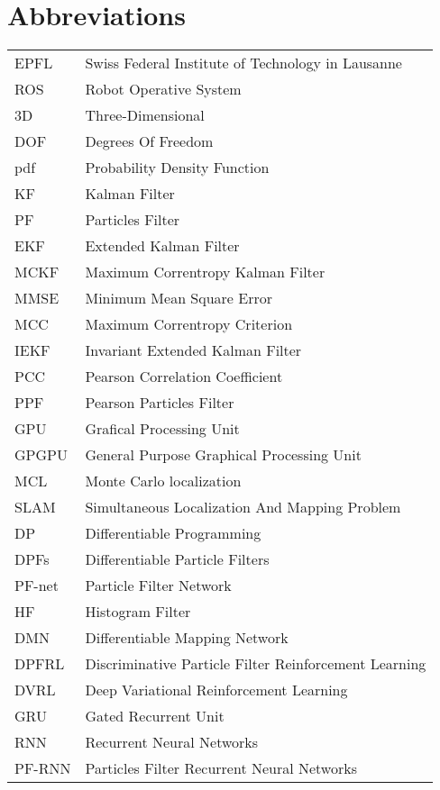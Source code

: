 \section{Abbreviations}
\begin{flushleft}
\begin{tabular}{l l}
EPFL & Swiss Federal Institute of Technology in Lausanne\\
ROS & Robot Operative System\\
3D & Three-Dimensional\\
DOF & Degrees Of Freedom\\
pdf & Probability Density Function\\
KF & Kalman Filter\\
PF & Particles Filter\\
EKF & Extended Kalman Filter\\
MCKF & Maximum Correntropy Kalman Filter\\
MMSE & Minimum Mean Square Error\\
MCC & Maximum Correntropy Criterion\\
IEKF & Invariant Extended Kalman Filter\\
PCC & Pearson Correlation Coefficient\\
PPF & Pearson Particles Filter\\
GPU & Grafical Processing Unit\\
GPGPU & General Purpose Graphical Processing Unit\\
MCL & Monte Carlo localization\\
SLAM & Simultaneous Localization And Mapping Problem\\
DP & Differentiable Programming\\
DPFs & Differentiable Particle Filters\\
PF-net & Particle Filter Network\\
HF & Histogram Filter\\
DMN & Differentiable Mapping Network\\
DPFRL & Discriminative Particle Filter Reinforcement Learning\\
DVRL & Deep Variational Reinforcement Learning \\
GRU & Gated Recurrent Unit \\
RNN & Recurrent Neural Networks\\
PF-RNN & Particles Filter Recurrent Neural Networks\\

\end{tabular}
\end{flushleft}

